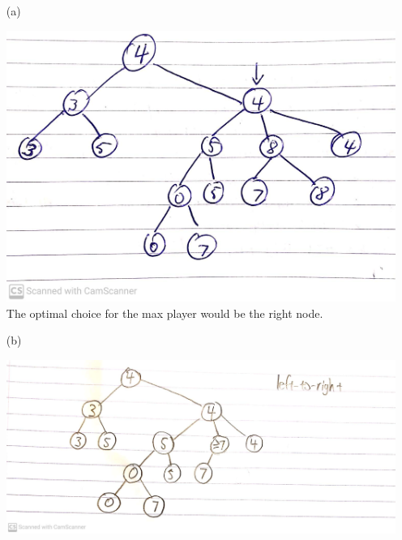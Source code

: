 \documentclass[11pt]{article}
\begin{document}
    \begin{enumerate}
        \item[(a)]
            \begin{minipage}[!htb]{\linewidth}
                \includegraphics[width=\linewidth]{images/minmax_tree} \\
                The optimal choice for the max player would be the right node.
            \end{minipage}

        \item[(b)] %
            \begin{minipage}[!htb]{\linewidth}
                \includegraphics[width=\linewidth]{images/l2r_minmax_tree} \\
            \end{minipage}


\end{enumerate}
\end{document}
